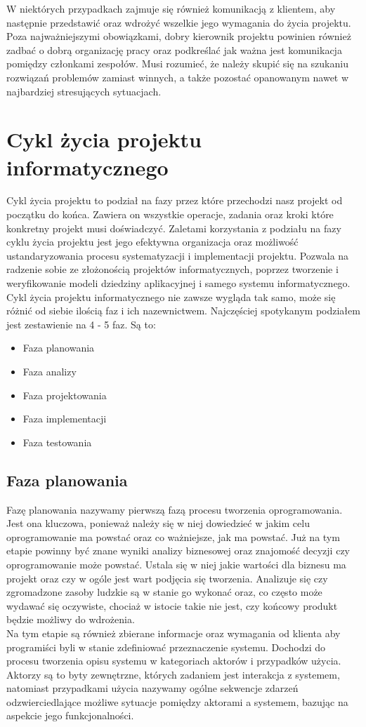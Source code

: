 \documentclass[oneside,polski,logo]{amuthesis}
\begin{document}
W niektórych przypadkach zajmuje się również komunikacją z klientem, aby następnie przedstawić oraz wdrożyć wszelkie jego wymagania do życia projektu. Poza najważniejszymi obowiązkami, dobry kierownik projektu powinien również zadbać o dobrą organizację pracy oraz podkreślać jak ważna jest komunikacja pomiędzy członkami zespołów. Musi rozumieć, że należy skupić się na szukaniu rozwiązań problemów zamiast winnych, a także pozostać opanowanym nawet w najbardziej stresujących sytuacjach.

\section{Cykl życia projektu informatycznego}
Cykl życia projektu to podział na fazy przez które przechodzi nasz projekt od początku do końca. Zawiera on wszystkie operacje, zadania oraz kroki które konkretny projekt musi doświadczyć. Zaletami korzystania z podziału na fazy cyklu życia projektu jest jego efektywna organizacja oraz możliwość ustandaryzowania procesu systematyzacji i implementacji projektu. Pozwala na radzenie sobie ze złożonością projektów informatycznych, poprzez tworzenie i weryfikowanie modeli dziedziny aplikacyjnej i samego systemu informatycznego.\cite{IO- Helion} Cykl życia projektu informatycznego nie zawsze wygląda tak samo, może się różnić od siebie ilością faz i ich nazewnictwem. Najczęściej spotykanym podziałem jest zestawienie na 4 - 5 faz.\cite{zarzadzanie5} Są to: \\
\begin{itemize}
	\item Faza planowania
	\item Faza analizy
	\item Faza projektowania
	\item Faza implementacji
	\item Faza testowania \\
\end{itemize}
\subsection {Faza planowania}
Fazę planowania nazywamy pierwszą fazą procesu tworzenia oprogramowania. Jest ona kluczowa, ponieważ należy się w niej dowiedzieć w jakim celu oprogramowanie ma powstać oraz co ważniejsze, jak ma powstać. Już na tym etapie powinny być znane wyniki analizy biznesowej oraz znajomość decyzji czy oprogramowanie może powstać. Ustala się w niej jakie wartości dla biznesu ma projekt oraz czy w ogóle jest wart podjęcia się tworzenia. Analizuje się czy zgromadzone zasoby ludzkie są w stanie go wykonać oraz, co często może wydawać się oczywiste, chociaż w istocie takie nie jest, czy końcowy produkt będzie możliwy do wdrożenia. \\
Na tym etapie są również zbierane informacje oraz wymagania od klienta aby programiści byli w stanie zdefiniować przeznaczenie systemu. Dochodzi do procesu tworzenia opisu systemu w kategoriach aktorów i przypadków użycia. Aktorzy są to byty zewnętrzne, których zadaniem jest interakcja z systemem, natomiast przypadkami użycia nazywamy ogólne sekwencje zdarzeń odzwierciedlające możliwe sytuacje pomiędzy aktorami a systemem, bazując na aspekcie jego funkcjonalności.
\end{document}
